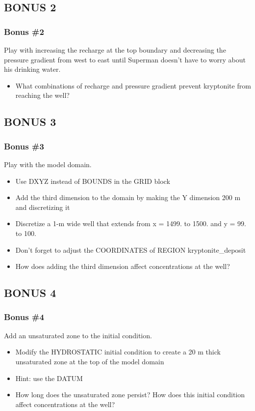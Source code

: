 \documentclass{beamer}
\begin{document}
\subsection{BONUS 2}

\begin{frame}[fragile]\frametitle{Bonus \#2}
Play with increasing the recharge at the top boundary and decreasing the pressure gradient from west to east until Superman doesn't have to worry about his drinking water. 

\begin{itemize}
  \item What combinations of recharge and pressure gradient prevent kryptonite from reaching the well?
\end{itemize}

\end{frame}

\subsection{BONUS 3}

\begin{frame}[fragile]\frametitle{Bonus \#3}
Play with the model domain.

\begin{itemize}
  \item Use DXYZ instead of BOUNDS in the GRID block
  \item Add the third dimension to the domain by making the Y dimension 200 m and discretizing it
  \item Discretize a 1-m wide well that extends from x = 1499. to 1500. and y = 99. to 100.
  \item Don't forget to adjust the COORDINATES of REGION kryptonite\_deposit
  \item How does adding the third dimension affect concentrations at the well?
\end{itemize}

\end{frame}

\subsection{BONUS 4}

\begin{frame}[fragile]\frametitle{Bonus \#4}
Add an unsaturated zone to the initial condition.

\begin{itemize}
  \item Modify the HYDROSTATIC initial condition to create a 20 m thick unsaturated zone at the top of the model domain
  \item Hint: use the DATUM
  \item How long does the unsaturated zone persist? How does this initial condition affect concentrations at the well?
\end{itemize}

\end{frame}
\end{document}
